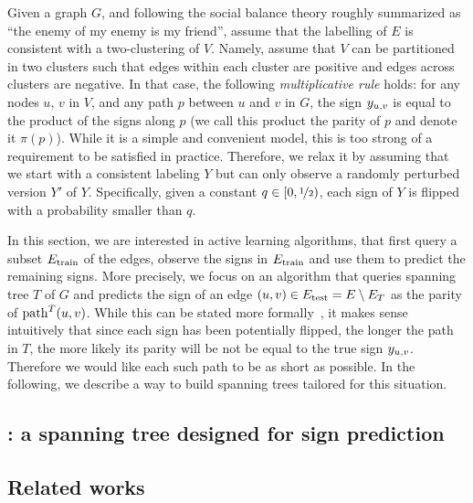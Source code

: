 \documentclass[nobib, a4paper, 10pt, oneside, onecolumn, openany, notitlepage, final,
svgnames, marginals=raggedouter, english,
]{article}
\begin{document}


Given a graph $G$, and following the social balance theory roughly summarized as \enquote{the enemy
of my enemy is my friend}, assume that the labelling of $E$ is consistent with a two-clustering of
$V$. Namely, assume that $V$ can be partitioned in two clusters such that edges within each cluster
are positive and edges across clusters are negative. In that case, the following
\emph{multiplicative rule} holds: for any nodes $u$, $v$ in $V$, and any path $p$ between $u$ and
$v$ in $G$, the sign $y_{u, v}$ is equal to the product of the signs along $p$ (we call this product the
parity of $p$ and denote it $\pi(p)$). While it is a simple and convenient model, this is too strong
of a requirement to be satisfied in practice. Therefore, we relax it by assuming that we start with
a consistent labeling $Y$ but can only observe a randomly perturbed version $Y'$ of $Y$.
Specifically, given a constant $q\in [0, \nicefrac{1}{2})$, each sign of $Y$ is flipped with a
probability smaller than $q$.

In this section, we are interested in active learning algorithms, that first query a subset
$E_{\mathrm{train}}$ of the edges, observe the signs in $E_{\mathrm{train}}$ and use them to predict the remaining signs.
More precisely, we focus on an algorithm that queries spanning tree $T$ of $G$ and predicts the sign
of an edge $(u,v) \in E_{\mathrm{test}} = E \setminus E_T$ as the parity of $\operatorname{path}^T(u, v)$. While this
can be stated more formally~\autocite[Section
4.1]{Cesa-Bianchi2012b}, it makes sense intuitively that since each sign has been potentially
flipped, the longer the path in $T$, the more likely its parity will be not be equal to the true
sign $y_{u, v}{}$. Therefore we would like each such path to be as short as possible. In the following,
we describe a way to build spanning trees tailored for this situation.

\subsection{\gtx{}: a spanning tree designed for sign prediction}
\label{sub:gtx_a_simple_low_stretch_tree_construction}



\subsection{Related works}
\label{sub:gtx_related_works}


\end{document}
